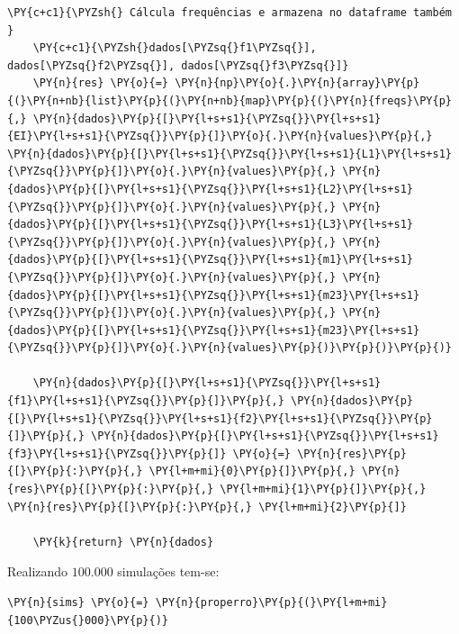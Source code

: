 \begin{tcolorbox}[breakable, size=fbox, boxrule=1pt, pad at break*=1mm,colback=cellbackground, colframe=cellborder]
\begin{Verbatim}[commandchars=\\\{\}]
    \PY{c+c1}{\PYZsh{} Cálcula frequências e armazena no dataframe também }
    \PY{c+c1}{\PYZsh{}dados[\PYZsq{}f1\PYZsq{}], dados[\PYZsq{}f2\PYZsq{}], dados[\PYZsq{}f3\PYZsq{}]}
    \PY{n}{res} \PY{o}{=} \PY{n}{np}\PY{o}{.}\PY{n}{array}\PY{p}{(}\PY{n+nb}{list}\PY{p}{(}\PY{n+nb}{map}\PY{p}{(}\PY{n}{freqs}\PY{p}{,} \PY{n}{dados}\PY{p}{[}\PY{l+s+s1}{\PYZsq{}}\PY{l+s+s1}{EI}\PY{l+s+s1}{\PYZsq{}}\PY{p}{]}\PY{o}{.}\PY{n}{values}\PY{p}{,} \PY{n}{dados}\PY{p}{[}\PY{l+s+s1}{\PYZsq{}}\PY{l+s+s1}{L1}\PY{l+s+s1}{\PYZsq{}}\PY{p}{]}\PY{o}{.}\PY{n}{values}\PY{p}{,} \PY{n}{dados}\PY{p}{[}\PY{l+s+s1}{\PYZsq{}}\PY{l+s+s1}{L2}\PY{l+s+s1}{\PYZsq{}}\PY{p}{]}\PY{o}{.}\PY{n}{values}\PY{p}{,} \PY{n}{dados}\PY{p}{[}\PY{l+s+s1}{\PYZsq{}}\PY{l+s+s1}{L3}\PY{l+s+s1}{\PYZsq{}}\PY{p}{]}\PY{o}{.}\PY{n}{values}\PY{p}{,} \PY{n}{dados}\PY{p}{[}\PY{l+s+s1}{\PYZsq{}}\PY{l+s+s1}{m1}\PY{l+s+s1}{\PYZsq{}}\PY{p}{]}\PY{o}{.}\PY{n}{values}\PY{p}{,} \PY{n}{dados}\PY{p}{[}\PY{l+s+s1}{\PYZsq{}}\PY{l+s+s1}{m23}\PY{l+s+s1}{\PYZsq{}}\PY{p}{]}\PY{o}{.}\PY{n}{values}\PY{p}{,} \PY{n}{dados}\PY{p}{[}\PY{l+s+s1}{\PYZsq{}}\PY{l+s+s1}{m23}\PY{l+s+s1}{\PYZsq{}}\PY{p}{]}\PY{o}{.}\PY{n}{values}\PY{p}{)}\PY{p}{)}\PY{p}{)}

    \PY{n}{dados}\PY{p}{[}\PY{l+s+s1}{\PYZsq{}}\PY{l+s+s1}{f1}\PY{l+s+s1}{\PYZsq{}}\PY{p}{]}\PY{p}{,} \PY{n}{dados}\PY{p}{[}\PY{l+s+s1}{\PYZsq{}}\PY{l+s+s1}{f2}\PY{l+s+s1}{\PYZsq{}}\PY{p}{]}\PY{p}{,} \PY{n}{dados}\PY{p}{[}\PY{l+s+s1}{\PYZsq{}}\PY{l+s+s1}{f3}\PY{l+s+s1}{\PYZsq{}}\PY{p}{]} \PY{o}{=} \PY{n}{res}\PY{p}{[}\PY{p}{:}\PY{p}{,} \PY{l+m+mi}{0}\PY{p}{]}\PY{p}{,} \PY{n}{res}\PY{p}{[}\PY{p}{:}\PY{p}{,} \PY{l+m+mi}{1}\PY{p}{]}\PY{p}{,} \PY{n}{res}\PY{p}{[}\PY{p}{:}\PY{p}{,} \PY{l+m+mi}{2}\PY{p}{]}

    \PY{k}{return} \PY{n}{dados}
\end{Verbatim}
\end{tcolorbox}

    Realizando \(100.000\) simulações tem-se:

    \begin{tcolorbox}[breakable, size=fbox, boxrule=1pt, pad at break*=1mm,colback=cellbackground, colframe=cellborder]
\begin{Verbatim}[commandchars=\\\{\}]
\PY{n}{sims} \PY{o}{=} \PY{n}{properro}\PY{p}{(}\PY{l+m+mi}{100\PYZus{}000}\PY{p}{)}
\end{Verbatim}
\end{tcolorbox}

